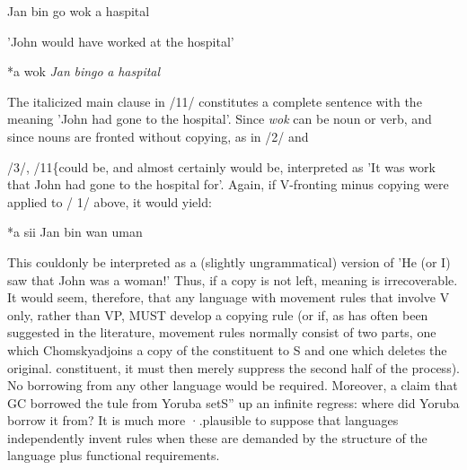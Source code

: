 \ea\label{ex:10}
 Jan bin go wok a haspital
\glt
\z

'John would have worked at the hospital'

\ea\label{ex:11}
 *a wok \textit{Jan} \textit{bi}\textit{n}\textit{go} \textit{a} \textit{haspital}
\glt
\z

The italicized main clause in /11/ constitutes a complete sentence with the meaning 'John had gone to the hospital'. Since \textit{wok} can be noun or verb, and since nouns are fronted without copying, as in /2/ and

/3/, /11\{could be, and almost certainly would be, interpreted as 'It was work that John had gone to the hospital for'. Again, if V-fronting minus copying were applied to / 1/ above, it would yield:

\ea\label{ex:12}
 *a sii Jan bin wan uman
\glt
\z

This couldonly be interpreted as a (slightly ungrammatical) version of 'He (or I) saw that John was a woman!' Thus, if a copy is not left, meaning is irrecoverable. It would seem, therefore, that any language with movement rules that involve V only, rather than VP, MUST de\-velop a copying rule (or if, as has often been suggested in the literature, movement rules normally consist of two parts, one which Chomsky\-adjoins a copy of the constituent to S and one which deletes the original. constituent, it must then merely suppress the second half of the process). No borrowing from any other language would be required. Moreover, a claim that GC borrowed the tule from Yoruba setS'' up an infinite regress: where did Yoruba borrow it from? It is much more ·.plausible to suppose that languages independently invent rules when these are demanded by the structure of the language plus func\-tional requirements.

